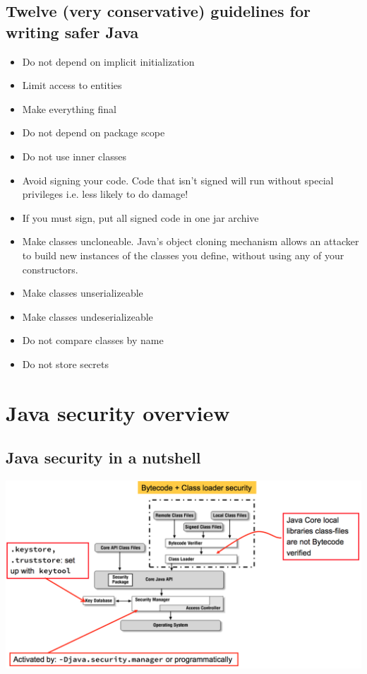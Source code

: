 \documentclass[10pt]{article}
\begin{document}
\subsection{Twelve (very conservative) guidelines for writing safer Java}
\begin{itemize}
	\item Do not depend on implicit initialization
	\item Limit access to entities
	\item Make everything final
	\item Do not depend on package scope
	\item Do not use inner classes
	\item Avoid signing your code. Code that isn't signed will run without special privileges i.e. less likely to do damage!
	\item If you must sign, put all signed code in one jar archive
	\item Make classes uncloneable. Java's object cloning mechanism allows an attacker to build new instances of the classes you define, without using any of your constructors.
	\item Make classes unserializeable
	\item Make classes undeserializeable
	\item Do not compare classes by name
	\item Do not store secrets
\end{itemize}

\newpage
\section{Java security overview}

\subsection{Java security in a nutshell}
\begin{center}
	\includegraphics[scale=0.2]{nutshell.png}
\end{center}
\end{document}
